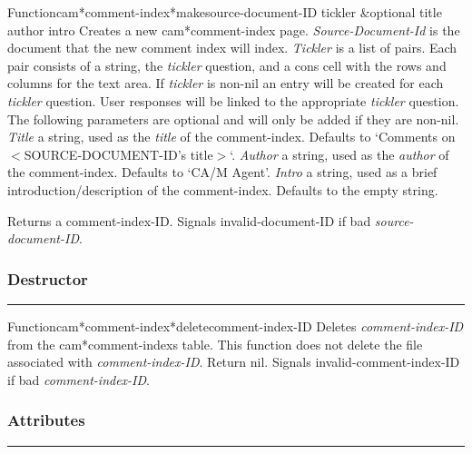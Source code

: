 \begin{functiondoc}{Function}{cam*comment-index*make}{source-document-ID tickler \&optional title author intro}
Creates a new cam*comment-index page.  {\em Source-Document-Id} is the document
that the new comment index will index.
{\em Tickler} is a list of pairs.  Each pair consists of a string, the {\em tickler} question, and
 a cons cell with the rows and columns for the text area.  If {\em tickler} is non-nil an
 entry will be created for each {\em tickler} question.  User responses will be linked to 
 the appropriate {\em tickler} question.
The following parameters are optional and will only be added if they are non-nil.
{\em Title} a string, used as the {\em title} of the comment-index.  Defaults to `Comments
 on $<$SOURCE-DOCUMENT-ID's title$>$`.
{\em Author} a string, used as the {\em author} of the comment-index.  Defaults to `CA/M Agent'.
{\em Intro} a string, used as a brief introduction/description of the comment-index.  
 Defaults to the empty string.

Returns a comment-index-ID.
Signals invalid-document-ID if bad {\em source-document-ID}.
\end{functiondoc}


\subsubsection*{Destructor}
\par\vspace*{0.00in}\par\hrule\par\medskip\par


\begin{functiondoc}{Function}{cam*comment-index*delete}{comment-index-ID}
Deletes {\em comment-index-ID} from the cam*comment-indexs table.
This function does not delete the file associated with {\em comment-index-ID}.
Return nil.
Signals invalid-comment-index-ID if bad {\em comment-index-ID}.
\end{functiondoc}


\subsubsection*{Attributes}
\par\vspace*{0.00in}\par\hrule\par\medskip\par


